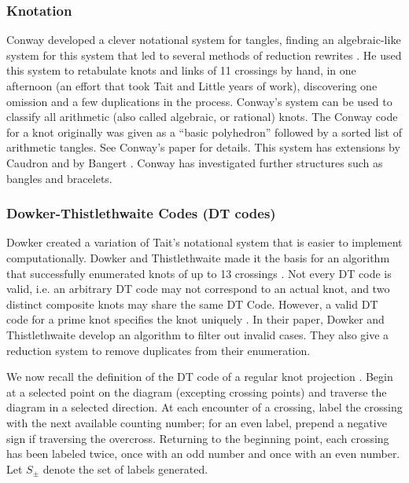 \subsubsection{Knotation} Conway developed a clever notational system
for tangles, finding an algebraic-like system for this system that led to several methods of reduction rewrites
\cite{Conway1970An-enumeration-}. He used this system to retabulate
knots and links of 11 crossings by hand, in one afternoon (an effort
that took Tait and Little years of work), discovering one omission and
a few duplications in the process. Conway's system can be used to
classify all arithmetic (also called algebraic, or rational)
knots. The Conway code for a knot originally was given as a “basic
polyhedron” followed by a sorted list of arithmetic tangles. See
Conway's paper \cite{Conway1970An-enumeration-} for details. This system has extensions by Caudron
\cite{Caudron1981-Classification} and by Bangert
\cite{Bangert2002Algorithmic-Pro}. Conway has investigated further
structures such as bangles and bracelets.

\subsubsection{Dowker-Thistlethwaite Codes (DT codes)}\label{ssub:dowker_thistlethwaite_codes} %
Dowker created a variation of Tait's notational system that is easier
to implement computationally. Dowker and Thistlethwaite made it the
basis for an algorithm that successfully enumerated knots of up to 13
crossings \cite{DT}. Not every DT code is valid, i.e. an arbitrary DT
code may not correspond to an actual knot, and two distinct composite
knots may share the same DT Code. However, a valid DT code for a prime
knot specifies the knot uniquely \cite{SchareinPhD}. In their paper,
Dowker and Thistlethwaite develop an algorithm to filter out invalid
cases. They also give a reduction system to remove duplicates from
their enumeration.

We now recall the definition of the DT code of
a regular knot projection \cite{DT}. Begin at a selected point on the
diagram (excepting crossing points) and traverse the diagram in a
selected direction. At each encounter of a crossing, label the
crossing with the next available counting number; for an even label,
prepend a negative sign if traversing the overcross. Returning to the
beginning point, each crossing has been labeled twice, once with an
odd number and once with an even number. Let $S_\pm$ denote the set of
labels generated.

